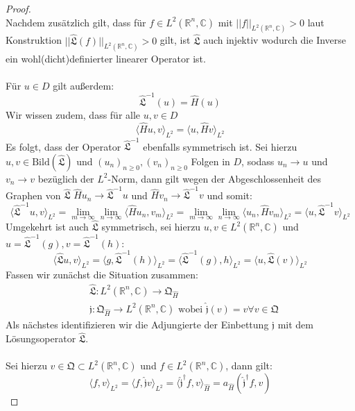 \documentclass[11pt,a4paper,leqno]{report}
\numberwithin{equation}{chapter}
\begin{document}
\begin{proof}
	\\
	Nachdem zusätzlich gilt, dass für $f\in L^2(\mathbb{R}^n,\mathbb{C})$ mit $||f||_{L^2(\mathbb{R}^n,\mathbb{C})}>0$ laut Konstruktion $||\hat{\mathfrak{L}}(f)||_{L^2(\mathbb{R}^n,\mathbb{C})}>0$ gilt, ist $\hat{\mathfrak{L}}$ auch injektiv wodurch die Inverse ein wohl(dicht)definierter linearer Operator ist.
	\\
	\\
	Für $u\in D$ gilt außerdem:
	\[\hat{\mathfrak{L}}^{-1}(u)=\hat{H}(u)\]
	Wir wissen zudem, dass für alle $u,v\in D$
	\[
	\langle \hat{H}u,v\rangle_{L^2}=\langle u,\hat{H}v\rangle_{L^2}
	\]
	Es folgt, dass der Operator $\hat{\mathfrak{L}}^{-1}$ ebenfalls symmetrisch ist. Sei hierzu $u,v\in \mathrm{Bild}(\hat{\mathfrak{L}})$ und $(u_n)_{n\geq 0}, (v_n)_{n\geq 0}$ Folgen in $D$, sodass $u_n\rightarrow u$ und $v_n\rightarrow v$ bezüglich der $L^2$-Norm, dann gilt wegen der Abgeschlossenheit des Graphen von $\hat{\mathfrak{L}}$ $\hat{H}u_n\rightarrow \hat{\mathfrak{L}}^{-1}u$ und $\hat{H}v_n\rightarrow \hat{\mathfrak{L}}^{-1}v$ und somit:
	\[
	\langle \hat{\mathfrak{L}}^{-1}u,v\rangle_{L^2}=\lim_{m\rightarrow\infty}\lim_{n\rightarrow\infty}\langle \hat{H}u_n,v_m\rangle_{L^2}=\lim_{m\rightarrow\infty}\lim_{n\rightarrow\infty}\langle u_n,\hat{H}v_m\rangle_{L^2}=\langle u,\hat{\mathfrak{L}}^{-1}v\rangle_{L^2}
	\]
	Umgekehrt ist auch $\hat{\mathfrak{L}}$ symmetrisch, sei hierzu $u, v\in L^2(\mathbb{R}^n,\mathbb{C})$ und $u=\hat{\mathfrak{L}}^{-1}(g), v=\hat{\mathfrak{L}}^{-1}(h)$:
	\[
		\langle \hat{\mathfrak{L}}u,v\rangle_{L^2}=\langle g,\hat{\mathfrak{L}}^{-1}(h)\rangle_{L^2}=\langle \hat{\mathfrak{L}}^{-1}(g), h\rangle_{L^2}=\langle u, \hat{\mathfrak{L}}(v)\rangle_{L^2}
	\]
	Fassen wir zunächst die Situation zusammen:
	\begin{align*}
		&\hat{\mathfrak{L}}:L^2(\mathbb{R}^n,\mathbb{C})\rightarrow\mathfrak{Q}_{\hat{H}}\\
		&\hat{\mathfrak{j}}:\mathfrak{Q}_{\hat{H}}\rightarrow L^2(\mathbb{R}^n,\mathbb{C})\text{ wobei }\hat{\mathfrak{j}}(v)=v\forall v\in \mathfrak{Q}
	\end{align*}
Als nächstes identifizieren wir die Adjungierte der Einbettung $\hat{\mathfrak{j}}$ mit dem Lösungsoperator $\hat{\mathfrak{L}}$. \\
\\
Sei hierzu $v\in\mathfrak{Q}\subset L^2(\mathbb{R}^n,\mathbb{C})$ und $f\in L^2(\mathbb{R}^n,\mathbb{C})$, dann gilt:
\begin{equation*}
	\langle f, v\rangle_{L^2}=\langle f, \hat{\mathfrak{j}}v\rangle_{L^2}=\langle \hat{\mathfrak{j}}^\dagger f, v\rangle_{\hat{H}}=a_{\hat{H}}(\hat{\mathfrak{j}}^\dagger f, v)

\end{equation*}
\end{proof}
\end{document}
